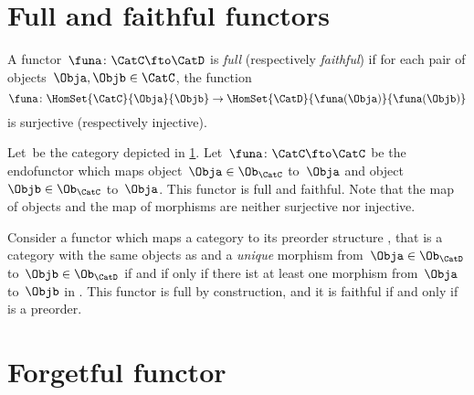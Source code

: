 

\section{Full and faithful functors}
\begin{ctdefinition}
  \label{def:functorfullfaith}
  A functor~$\funa\colon \CatC \fto \CatD$ is \emph{full} (respectively \emph{faithful}) if for each pair of objects~$\Obja,\Objb\in \CatC$, the function
  \begin{equation}
    \funa \colon \HomSet{\CatC}{\Obja}{\Objb} \to \HomSet{\CatD}{\funa(\Obja)}{\funa(\Objb)}
  \end{equation}
  is surjective (respectively injective).
\end{ctdefinition}

\begin{example}
  Let~\CatC be the category depicted in \cref{fig:ex_full_faithful_1}. Let~$\funa\colon \CatC \fto \CatC$ be the endofunctor which maps object~$\Obja\in \Ob_{\CatC}$ to~$\Obja$ and object~$\Objb\in \Ob_{\CatC}$ to~$\Obja$. This functor is full and faithful. Note that the map of objects and the map of morphisms are neither surjective nor injective.

  \begin{figure}[h!]
    \centering
    \caption{\label{fig:ex_full_faithful_1}}
  \end{figure}
\end{example}

\begin{example}
  Consider a functor which maps a category \CatC to its preorder structure \CatD, that is a category with the same objects as \CatC and a \emph{unique} morphism from~$\Obja\in \Ob_\CatD$ to~$\Objb\in \Ob_\CatD$ if and if only if there ist at least one morphism from~$\Obja$ to~$\Objb$ in \CatC. This functor is full by construction, and it is faithful if and only if \CatC is a preorder.
\end{example}


\section{Forgetful functor}

